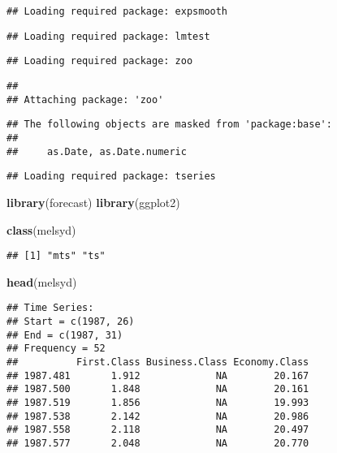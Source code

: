 \documentclass[]{article}
\newenvironment{Shaded}{\begin{snugshade}}{\end{snugshade}}
\newcommand{\KeywordTok}[1]{\textcolor[rgb]{0.13,0.29,0.53}{\textbf{#1}}}
\newcommand{\NormalTok}[1]{#1}
\begin{document}
\begin{verbatim}
## Loading required package: expsmooth
\end{verbatim}

\begin{verbatim}
## Loading required package: lmtest
\end{verbatim}

\begin{verbatim}
## Loading required package: zoo
\end{verbatim}

\begin{verbatim}
## 
## Attaching package: 'zoo'
\end{verbatim}

\begin{verbatim}
## The following objects are masked from 'package:base':
## 
##     as.Date, as.Date.numeric
\end{verbatim}

\begin{verbatim}
## Loading required package: tseries
\end{verbatim}

\begin{Shaded}
\begin{Highlighting}[]
\KeywordTok{library}\NormalTok{(forecast)}
\KeywordTok{library}\NormalTok{(ggplot2)}

\KeywordTok{class}\NormalTok{(melsyd)}
\end{Highlighting}
\end{Shaded}

\begin{verbatim}
## [1] "mts" "ts"
\end{verbatim}

\begin{Shaded}
\begin{Highlighting}[]
\KeywordTok{head}\NormalTok{(melsyd)}
\end{Highlighting}
\end{Shaded}

\begin{verbatim}
## Time Series:
## Start = c(1987, 26) 
## End = c(1987, 31) 
## Frequency = 52 
##          First.Class Business.Class Economy.Class
## 1987.481       1.912             NA        20.167
## 1987.500       1.848             NA        20.161
## 1987.519       1.856             NA        19.993
## 1987.538       2.142             NA        20.986
## 1987.558       2.118             NA        20.497
## 1987.577       2.048             NA        20.770
\end{verbatim}
\end{document}
